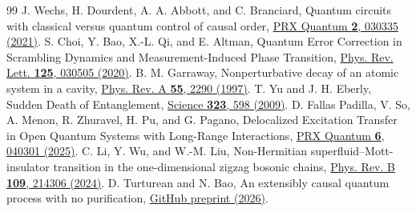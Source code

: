 \documentclass[11pt]{article}
\begin{document}
\begin{thebibliography}{99}
 J. Wechs, H. Dourdent, A. A. Abbott, and C. Branciard, Quantum circuits with classical versus quantum control of causal order, \href{https://doi.org/10.1103/PRXQuantum.2.030335}{PRX Quantum \textbf{2}, 030335 (2021)}.
 S. Choi, Y. Bao, X.-L. Qi, and E. Altman, Quantum Error Correction in Scrambling Dynamics and Measurement-Induced Phase Transition, \href{https://doi.org/10.1103/PhysRevLett.125.030505}{Phys. Rev. Lett. \textbf{125}, 030505 (2020)}.
 B. M. Garraway, Nonperturbative decay of an atomic system in a cavity, \href{https://doi.org/10.1103/PhysRevA.55.2290}{Phys. Rev. A \textbf{55}, 2290 (1997)}.
 T. Yu and J. H. Eberly, Sudden Death of Entanglement, \href{https://doi.org/10.1126/science.1167343}{Science \textbf{323}, 598 (2009)}.
 D. Fallas Padilla, V. So, A. Menon, R. Zhuravel, H. Pu, and G. Pagano, Delocalized Excitation Transfer in Open Quantum Systems with Long-Range Interactions, \href{https://doi.org/10.1103/bxwl-sbsn}{PRX Quantum \textbf{6}, 040301 (2025)}.
 C. Li, Y. Wu, and W.-M. Liu, Non-Hermitian superfluid--Mott-insulator transition in the one-dimensional zigzag bosonic chains, \href{https://doi.org/10.1103/PhysRevB.109.214306}{Phys. Rev. B \textbf{109}, 214306 (2024)}.
 D. Turturean and N. Bao, An extensibly causal quantum process with no purification, \href{https://github.com/physical-superintelligence/oqp-batch-2026/blob/7049357c42a8fe85262da08fdc10d57b4d9e67a0/oqp43-extensible-causality/paper/oqp43-extensible-causality.pdf}{GitHub preprint (2026)}.
\end{thebibliography}
\end{document}
